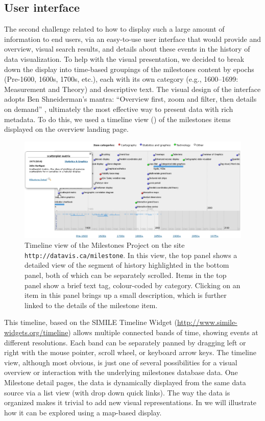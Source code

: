 \subsection{User interface}
The second challenge related to how to display such a large amount of information to end users, via an easy-to-use user interface that would provide and overview, visual search results, and details about these events in the history of data visualization. To help with the visual presentation, we decided to break down the display into time-based groupings of the milestones content by epochs (Pre-1600, 1600s, 1700s, etc.), each with its own category (e.g., 1600--1699: Measurement and Theory) and descriptive text. The visual design of the interface adopts Ben Shneiderman's mantra: ``Overview first, zoom and filter, then details on demand'' \citep{Shneiderman:1996:IEEE}, ultimately the most effective way to present data with rich metadata. To do this, we used a timeline view () of the milestones items displayed on the overview landing page. 

\begin{figure}[!htb]
  \centering
  \includegraphics[width=\textwidth,clip]{fig/datavis-timeline2}
  \caption{Timeline view of the Milestones Project on the site \texttt{http://datavis.ca/milestone}. In this view, the top panel shows a detailed view of the segment of history highlighted in the bottom panel, both of which can be separately scrolled. Items in the top panel show a brief text tag, colour-coded by category. Clicking on an item in this panel brings up a small description, which is further linked to the details of the milestone item.}
  \label{fig:datavis-timeline2}
\end{figure}

This timeline, based on the SIMILE Timeline Widget (\url{http://www.simile-widgets.org/timeline}) allows multiple connected bands of time, showing events at different resolutions. Each band can be separately panned by dragging left or right with the mouse pointer, scroll wheel, or keyboard arrow keys. The timeline view, although most obvious, is just one of several possibilities for a visual overview or interaction with the underlying milestones database data. One Milestone detail pages, the data is dynamically displayed from the same data source via a list view (with drop down quick links). The way the data is organized makes it trivial to add new visual representations. In  we will illustrate how it can be explored using a map-based display.
 

